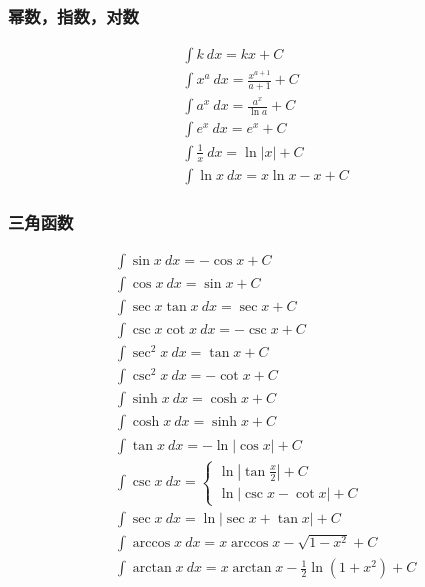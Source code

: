 \subsubsection{幂数，指数，对数}
\begin{align}
&\int k\ dx=kx +C \label{integral_0_1}\\
&\int x^a \ dx = \frac{x^{a+1}}{a+1} + C \label{integral_0_2}\\
&\int a^x \ dx = \frac{a^x}{\ln a} + C \label{integral_0_3}\\
&\int e^x \ dx = e^x + C \label{integral_0_4}\\
&\int \frac{1}{x} \ dx = \ln\left|x\right| + C \label{integral_0_5}\\
&\int \ln x\ dx=x\ln x-x+C \label{integral_0_6}
\end{align}
\subsubsection{三角函数}
\begin{align}
    &\int\sin x\ dx = -\cos x + C \label{integral_sin}\\
    &\int\cos x \ dx = \sin x + C \label{integral_cos}\\
    &\int\sec x \tan x\ dx= \sec x + C \label{integral_sec_tan}\\
    &\int\csc x\cot x \ dx = -\csc x + C \label{integral_csc_cot}\\
    &\int\sec^2 x \ dx = \tan x + C \label{integral_sec_sec}\\
    &\int\csc^2 x\ dx= -\cot x +C \label{integral_csc_csc}\\
    &\int\sinh x \ dx = \cosh x + C \label{integral_sinh}\\
    &\int\cosh x \ dx = \sinh x + C \label{integral_cosh}\\
    &\int\tan x\ dx=-\ln\left|\cos x\right|+C \label{integral_tan}\\
&\int \csc x\ dx=\begin{cases}
    \ln \left|\tan \frac{x}{2}\right|+C\\
    \ln \left|\csc x -\cot x \right|+C
\end{cases} \label{integral_csc}\\
&\int \sec x\ dx=\ln \left|\sec x+\tan x\right|+C \label{integral_sec}\\
&\int \arccos x\ dx= x\arccos x-\sqrt{1-x^2} +C \label{integral_arccos}\\
&\int \arctan x\ dx= x\arctan x-\frac{1}{2}\ln (1+x^2)+C \label{integral_arctan}
\end{align}

